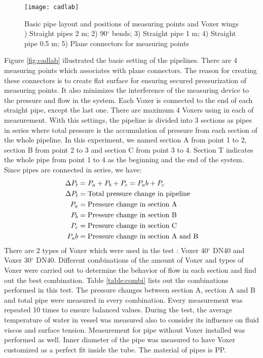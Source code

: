 \begin{figure}[h]
  \centering
  \texttt{[image: cadlab]}
  \caption{ Basic pipe layout and positions of measuring points and Voxer wings ) Straight pipes 2 m; 2) 90$^{\circ}$ bends; 3) Straight pipe 1 m; 4) Straight pipe 0.5 m; 5) Plane connectors for measuring points}
  \label{fig:cadlab}
\end{figure}

Figure \vref{fig:cadlab} illustrated the basic setting of the pipelines. There are 4 measuring points which associates with plane connectors. The reason for creating these connectors is to create flat surface for ensuring secured pressurization of measuring points. It also minimizes the interference of the measuring device to the pressure and flow in the system. Each Voxer is connected to the end of each straight pipe, except the last one. There are maximum 4 Voxers using in each of measurement. With this settings, the pipeline is divided into 3 sections as pipes in series where total pressure is the accumulation of pressure from each section of the whole pipeline. In this experiment, we named section A from point 1 to 2, section B from point 2 to 3 and section C from point 3 to 4. Section T indicates the whole pipe from point 1 to 4 as the beginning and the end of the system. 
Since pipes are connected in series, we have:
\begin{align}
\Delta P_t&= P_a + P_b + P_c = P_ab + P_c \\
\Delta P_t&= \textnormal{Total pressure change in pipeline} \\
P_a&= \textnormal{Pressure change in section A} \\
P_b&= \textnormal{Pressure change in section B} \\
P_c&= \textnormal{Pressure change in section C} \\
P_ab&= \textnormal{Pressure change in section A and B} \\
\end{align}
There are 2 types of Voxer which were used in the test : Voxer 40$^{\circ}$ DN40 and Voxer 30$^{\circ}$ DN40.  Different combinations of the amount of Voxer and types of Voxer were carried out to determine the behavior of flow in each section and find out the best combination. Table \ref{table:combi} lists out the combinations performed in this test. The pressure changes between section A, section A and B and total pipe were measured in every combination. Every measurement was repeated 10 times to ensure balanced values. During the test, the average temperature of water in vessel was measured also to consider its influence on fluid \gls{viscos} and surface tension. Measurement for pipe without Voxer installed was performed as well. Inner diameter of the pipe was measured to have Voxer customized as a perfect fit inside the tube. The material of pipes is PP.


